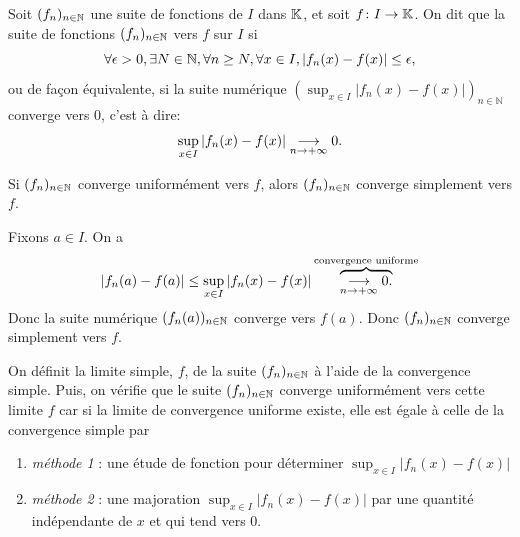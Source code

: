 \documentclass{book}
\newcommand{\fn}{(f_n)_{n\in \N   }}
\begin{document}
\begin{Definition}[Convergence uniforme $\fn$]
Soit $\fn$ une suite de fonctions de $I$ dans $\mathbb{K}  $, et soit $f \colon I \to\mathbb{K}  $.
On dit que la suite de fonctions $\fn$  vers $f$ sur $I$ si 
\[ \forall  \epsilon>0 , \exists N\in \mathbb{N} , \forall  n\geq N ,\forall  x\in I, \left|f_n(x) - f(x)\right| \leq  \epsilon, \]
ou de façon équivalente, si la suite numérique $(\sup_{x\in I} \left|f_n(x) - f(x)\right|)_{n\in\mathbb{N}}$ converge vers 0, c'est à dire:
\[  \sup_{x\in I} \left|f_n(x) - f(x)\right|   \tend[n\to+\infty ]0.  \]
\end{Definition}

\begin{Proposition}
Si $\fn$ converge uniformément vers $f$, alors $\fn$ converge simplement vers $f$.
\end{Proposition}
\begin{Demonstration}
Fixons $a\in I$. On a$$ \left|f_n(a) - f(a)\right|\leq   \sup_{x\in I} \left|f_n(x) - f(x)\right|  \overbrace{\tend[n\to+\infty ]0.}^{\text{convergence uniforme}}$$
Donc la suite numérique $(f_n(a))_{n\in\mathbb{N}}$ converge vers $f(a)$. Donc  $\fn$ converge simplement vers $f$.
\end{Demonstration}
\begin{Methode}
On définit la limite simple, $f$, de la suite $\fn$ à l'aide de la convergence simple. Puis, on vérifie que le suite  $\fn$ converge uniformément vers cette limite $f$ car si la limite de convergence uniforme existe, elle est égale à celle de la convergence simple par 
\begin{enumerate}
\item\textit{ méthode 1} : une étude de fonction pour déterminer $\sup_{x\in I}\left|f_n(x) - f(x)\right|$
\item\textit{ méthode 2} :  une majoration $\sup_{x\in I}\left|f_n(x) - f(x)\right|$ par une quantité indépendante de $x$ et qui tend vers 0.
\end{enumerate}
\end{Methode}
\end{document}
